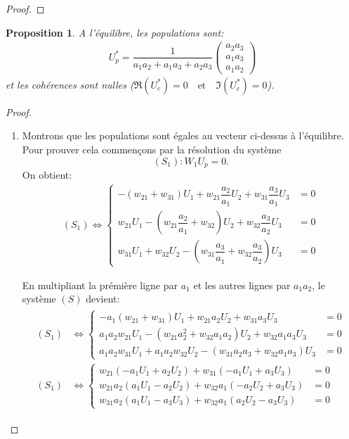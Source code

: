 \documentclass[12pt,a4paper,openany,oneside]{book}
\newtheorem{proposition}{Proposition}[chapter]
\begin{document}
{{{{{{\begin{proof}
\end{proof}

\begin{proposition}
A l'équilibre, les populations sont:
\begin{eqnarray}\label{sol à l'équilibre modele lineaire} 
U_{p}^{*} = \dfrac{1}{a_{1}a_{2}+a_{1}a_{3}+ a_{2}a_{3}}
\begin{pmatrix}     
a_{2}a_{3}\\
a_{1}a_{3}\\
a_{1}a_{2}
 \end{pmatrix}
  \end{eqnarray}
et les cohérences sont nulles ($ \Re(U_{c}^{*})=0 \quad \textrm{et} \quad \Im(U_{c}^{*})=0 $).
\end{proposition}

\begin{proof}
\begin{enumerate}

\item Montrons que les populations sont égales au vecteur ci-dessus à l'équilibre.
Pour prouver cela commençons par la résolution du système 
$$ (S_{1}):  W_{1}U_{p}=0 .$$ 
On obtient:
 \begin{eqnarray*}
  (S_{1})\Leftrightarrow\left\{
 \begin{split}
  -(w_{21} + w_{31})U_{1} + w_{21}\dfrac{a_{2}}{a_{1}}U_{2}+ w_{31}\dfrac{a_{3}}{a_{1}}U_{3} & =0 \\
 w_{21}U_{1}-(w_{21}\dfrac{a_{2}}{a_{1}} + w_{32})U_{2} + w_{32}\dfrac{a_{3}}{a_{2}}U_{3} & =0 \\
  w_{31}U_{1}+ w_{32}U_{2}-(w_{31}\dfrac{a_{3}}{a_{1}} + w_{32}\dfrac{a_{3}}{a_{2}})U_{3} & =0  
  \end{split}  
   \right.   
  \end{eqnarray*}
  
  En multipliant la prémière ligne par $ a_{1} $ et les autres lignes par $ a_{1}a_{2} $, le système $(S)$ devient:
\begin{eqnarray*}
\begin{split}
 (S_{1})&\Leftrightarrow\left\{
 \begin{split}
  -a_{1}(w_{21} + w_{31})U_{1} + w_{21}a_{2}U_{2}+ w_{31}a_{3}U_{3} &=0\\
 a_{1}a_{2}w_{21}U_{1}-(w_{21}a_{2}^{2} + w_{32}a_{1}a_{2})U_{2} + w_{32}a_{1}a_{3}U_{3} &=0\\ 
  a_{1}a_{2}w_{31}U_{1}+ a_{1}a_{2}w_{32}U_{2}-(w_{31}a_{2}a_{3} + w_{32}a_{1}a_{3})U_{3} & =0  
 \end{split}  
   \right.\\   
  (S_{1})&\Leftrightarrow\left\{
 \begin{split}
  w_{21}(-a_{1}U_{1}+a_{2}U_{2})+ w_{31}( -a_{1}U_{1}+ a_{3}U_{3}) &=0\\
   w_{21}a_{2}(a_{1}U_{1}-a_{2}U_{2})+ w_{32}a_{1}( -a_{2}U_{2}+ a_{3}U_{3}) &=0\\
    w_{31}a_{2}(a_{1}U_{1}-a_{3}U_{3})+ w_{32}a_{1}( a_{2}U_{2}- a_{3}U_{3}) &=0  
 \end{split}  
   \right. 
   \end{split}  
  \end{eqnarray*}
  

\end{enumerate}
\end{proof}}}}}}}
\end{document}
